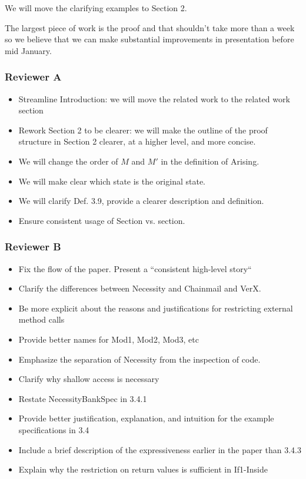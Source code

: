 \documentclass[11pt]{amsart}
\begin{document}
We will move the clarifying examples to Section 2.

The largest piece of work is the proof and that shouldn't take more than a week so we believe that we can make substantial improvements in presentation before mid January.


\subsubsection*{Reviewer A}
\begin{itemize}
\item Streamline Introduction: we will move the related work to the related work section
\item Rework Section 2 to be clearer: we will make the outline of the proof structure in Section 2 clearer, at a higher level, and more concise.
\item We will change the order of $M$ and $M'$ in the definition of Arising.
\item We will make clear which state is the original state.
\item We will clarify Def. 3.9, provide a clearer description and definition.
\item Ensure consistent usage of Section vs. section.
\end{itemize}

\subsubsection*{Reviewer B}
\begin{itemize}
\item Fix the flow of the paper. Present a ``consistent high-level story``
\item Clarify the differences between Necessity and Chainmail and VerX.
\item Be more explicit about the reasons and justifications for restricting external method calls
\item Provide better names for Mod1, Mod2, Mod3, etc
\item Emphasize the separation of Necessity from the inspection of code.
\item Clarify why shallow access is necessary
\item Restate NecessityBankSpec in 3.4.1
\item Provide better justification, explanation, and intuition for the example specifications in 3.4
\item Include a brief description of the expressiveness earlier in the paper than 3.4.3
\item Explain why the restriction on return values is sufficient in If1-Inside
\end{itemize}
\end{document}
